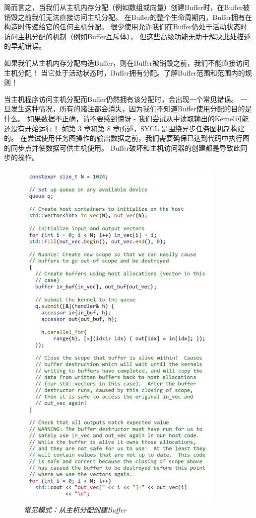 简而言之，当我们从主机内存分配（例如数组或向量）创建Buffer时，在Buffer被销毁之前我们无法直接访问主机分配。 
在Buffer的整个生命周期内，Buffer拥有在构造时传递给它的任何主机分配。 
很少使用允许我们在Buffer仍处于活动状态时访问主机分配的机制（例如Buffer互斥体），
但这些高级功能无助于解决此处描述的早期错误。

\begin{remark}
如果我们从主机内存分配构造Buffer，则在Buffer被销毁之前，我们不能直接访问主机分配！
当它处于活动状态时，Buffer拥有分配。了解Buffer范围和范围内的规则！
\end{remark}

当主机程序访问主机分配而Buffer仍然拥有该分配时，会出现一个常见错误。 
一旦发生这种情况，所有的赌注都会消失，因为我们不知道Buffer使用分配的目的是什么。 
如果数据不正确，请不要感到惊讶 - 我们尝试从中读取输出的Kernel可能还没有开始运行！ 
如第 3 章和第 8 章所述，SYCL 是围绕异步任务图机制构建的。 
在尝试使用任务图操作的输出数据之前，我们需要确保已达到代码中执行图的同步点并使数据可供主机使用。 
Buffer破坏和主机访问器的创建都是导致此同步的操作。

\begin{figure}[H]
	\centering
	\includegraphics[width=0.9\textwidth]{figs/F13.9.png}
	\caption{\textit{常见模式：从主机分配创建Buffer }}
\end{figure}

